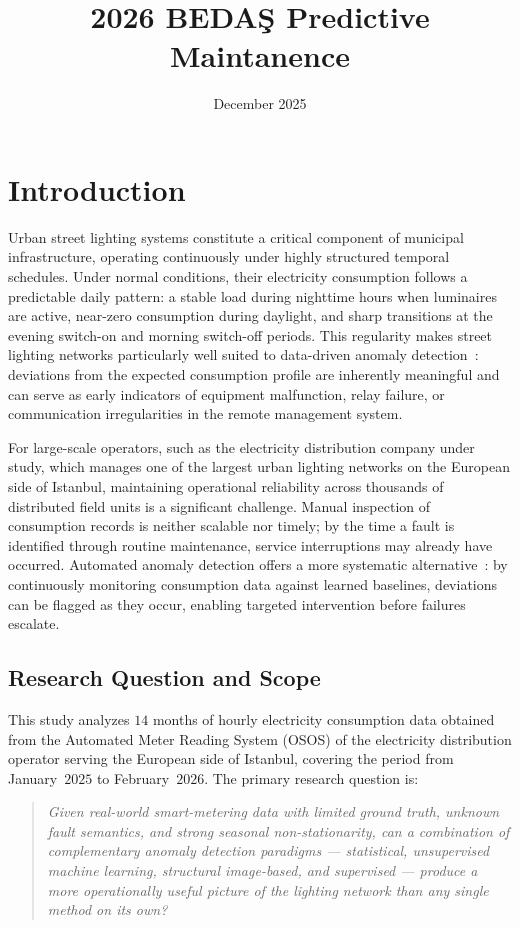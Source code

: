 \documentclass{article}
\title{2026 BEDAŞ Predictive Maintanence}
\author{}
\date{December 2025}
\begin{document}
\maketitle

\section{Introduction}
Urban street lighting systems constitute a critical component of municipal infrastructure, operating continuously under highly structured temporal schedules. Under normal conditions, their electricity consumption follows a predictable daily pattern: a stable load during nighttime hours when luminaires are active, near-zero consumption during daylight, and sharp transitions at the evening switch-on and morning switch-off periods. This regularity makes street lighting networks particularly well suited to data-driven anomaly detection~\cite{nespoli2024street,ptacek2022road}: deviations from the expected consumption profile are inherently meaningful and can serve as early indicators of equipment malfunction, relay failure, or communication irregularities in the remote management system.

For large-scale operators, such as the electricity distribution company under study, which manages one of the largest urban lighting networks on the European side of Istanbul, maintaining operational reliability across thousands of distributed field units is a significant challenge. Manual inspection of consumption records is neither scalable nor timely; by the time a fault is identified through routine maintenance, service interruptions may already have occurred. Automated anomaly detection offers a more systematic alternative~\cite{himeur2021survey,wang2020review}: by continuously monitoring consumption data against learned baselines, deviations can be flagged as they occur, enabling targeted intervention before failures escalate.

\subsection*{Research Question and Scope}
This study analyzes $14$ months of hourly electricity consumption data obtained from the Automated Meter Reading System (OSOS) of the electricity distribution operator serving the European side of Istanbul, covering the period from January~$2025$ to February~$2026$. The primary research question is:

\begin{quote}
\emph{Given real-world smart-metering data with limited ground truth, unknown fault semantics, and strong seasonal non-stationarity, can a combination of complementary anomaly detection paradigms --- statistical, unsupervised machine learning, structural image-based, and supervised --- produce a more operationally useful picture of the lighting network than any single method on its own?}
\end{quote}
\end{document}
